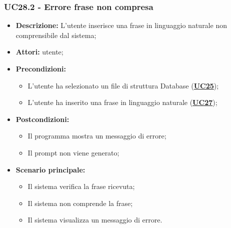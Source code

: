 \subsubsection{UC28.2 - Errore frase non compresa}
\label{sec:UC28.2}
\begin{itemize}
	\item \textbf{Descrizione:} L’utente inserisce una frase in linguaggio naturale non comprensibile dal sistema;
	\item \textbf{Attori:} utente;
	\item \textbf{Precondizioni:} 
	\begin{itemize}
		\item L’utente ha selezionato un file di struttura Database (\hyperref[sec:UC25]{\textbf{UC25}});
		\item L'utente ha inserito una frase in linguaggio naturale (\hyperref[sec:UC27]{\textbf{UC27}});
	\end{itemize}
	\item \textbf{Postcondizioni:} 
	\begin{itemize}
		\item Il programma mostra un messaggio di errore;
		\item Il prompt non viene generato;
	\end{itemize}
	\item \textbf{Scenario principale:} 
	\begin{itemize}
		\item Il sistema verifica la frase ricevuta;
		\item Il sistema non comprende la frase;
		\item Il sistema visualizza un messaggio di errore.
	\end{itemize}
\end{itemize}


